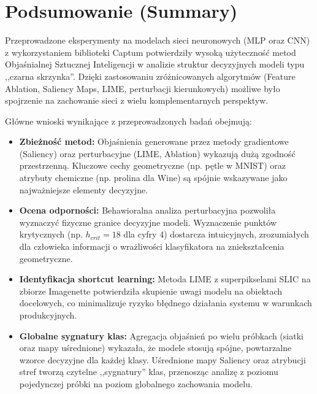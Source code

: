 \documentclass[10pt,journal,compsoc]{IEEEtran}
\begin{document}
\section{Podsumowanie (Summary)}
Przeprowadzone eksperymenty na modelach sieci neuronowych (MLP oraz CNN) z wykorzystaniem biblioteki Captum potwierdziły wysoką użyteczność metod Objaśnialnej Sztucznej Inteligencji w analizie struktur decyzyjnych modeli typu ,,czarna skrzynka''. Dzięki zastosowaniu zróżnicowanych algorytmów (Feature Ablation, Saliency Maps, LIME, perturbacji kierunkowych) możliwe było spojrzenie na zachowanie sieci z wielu komplementarnych perspektyw.

Główne wnioski wynikające z przeprowadzonych badań obejmują:
\begin{itemize}
    \item \textbf{Zbieżność metod:} Objaśnienia generowane przez metody gradientowe (Saliency) oraz perturbacyjne (LIME, Ablation) wykazują dużą zgodność przestrzenną. Kluczowe cechy geometryczne (np. pętle w MNIST) oraz atrybuty chemiczne (np. prolina dla Wine) są spójnie wskazywane jako najważniejsze elementy decyzyjne.
    \item \textbf{Ocena odporności:} Behawioralna analiza perturbacyjna pozwoliła wyznaczyć fizyczne granice decyzyjne modeli. Wyznaczenie punktów krytycznych (np. $h_{crit}=18$ dla cyfry 4) dostarcza intuicyjnych, zrozumiałych dla człowieka informacji o wrażliwości klasyfikatora na zniekształcenia geometryczne.
    \item \textbf{Identyfikacja shortcut learning:} Metoda LIME z superpikselami SLIC na zbiorze Imagenette potwierdziła skupienie uwagi modelu na obiektach docelowych, co minimalizuje ryzyko błędnego działania systemu w warunkach produkcyjnych.
    \item \textbf{Globalne sygnatury klas:} Agregacja objaśnień po wielu próbkach (siatki oraz mapy uśrednione) wykazała, że modele stosują spójne, powtarzalne wzorce decyzyjne dla każdej klasy. Uśrednione mapy Saliency oraz atrybucji stref tworzą czytelne ,,sygnatury'' klas, przenosząc analizę z poziomu pojedynczej próbki na poziom globalnego zachowania modelu.
\end{itemize}
\end{document}
